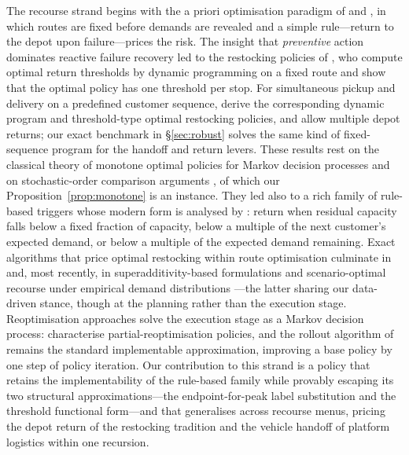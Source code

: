 \documentclass[preprint,authoryear,12pt]{elsarticle}
\theoremstyle{definition}
\theoremstyle{remark}
\begin{document}
The recourse strand begins with the a priori optimisation paradigm of
\citet{bertsimas1992vehicle} and \citet{dror1989vehicle}, in which
routes are fixed before demands are revealed and a simple rule---return
to the depot upon failure---prices the risk. The insight that
\emph{preventive} action dominates reactive failure recovery led to the
restocking policies of \citet{yang2000stochastic}, who compute optimal
return thresholds by dynamic programming on a fixed route and show that
the optimal policy has one threshold per stop. For simultaneous pickup and
delivery on a predefined customer sequence, \citet{minis2011stochastic}
derive the corresponding dynamic program and threshold-type optimal
restocking policies, and \citet{tatarakis2009stochastic} allow multiple
depot returns; our exact benchmark in \S\ref{sec:robust} solves the
same kind of fixed-sequence program for the handoff and return levers.
These results rest on the classical theory of monotone optimal policies
for Markov decision processes \citep{serfozo1976monotone,
puterman1994markov} and on stochastic-order comparison arguments
\citep{muller2002comparison}, of which our Proposition~\ref{prop:monotone}
is an instance. They led also to a rich
family of rule-based triggers whose modern form is analysed by
\citet{salavati2019rule}: return when residual capacity falls below a
fixed fraction of capacity, below a multiple of the next customer's
expected demand, or below a multiple of the expected demand remaining.
Exact algorithms that price optimal restocking within route optimisation
culminate in \citet{florio2020new} and, most recently, in
superadditivity-based formulations \citep{legault2025superadditivity}
and scenario-optimal recourse under empirical demand distributions
\citep{ota2026scenario}---the latter sharing our data-driven stance,
though at the planning rather than the execution stage. Reoptimisation
approaches solve the execution stage as a Markov decision process:
\citet{secomandi2009reoptimization} characterise partial-reoptimisation
policies, and the rollout algorithm of \citet{secomandi2001rollout}
remains the standard implementable approximation, improving a base
policy by one step of policy iteration. Our contribution to this strand
is a policy that retains the implementability of the rule-based family
while provably escaping its two structural approximations---the
endpoint-for-peak label substitution and the threshold functional
form---and that generalises across recourse menus, pricing the depot
return of the restocking tradition and the vehicle handoff of platform
logistics within one recursion.
\end{document}
